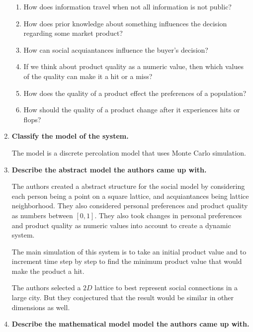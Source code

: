 \documentclass[article, 11pt, a4paper]{memoir}
\begin{document}
\begin{enumerate}[left=0pt, itemsep=20pt, label={\(\square\)}]
        \begin{enumerate}
            \item How does information travel when not all information is not public?
            \item How does prior knowledge about something influences the decision
                regarding some market product?
            \item How can social acquiantances influence the buyer's decision?
            \item If we think about product quality as a numeric value, then which values
                of the quality can make it a hit or a miss?
            \item How does the quality of a product effect the preferences of a
                population?
            \item How should the quality of a product change after it experiences hits or
                flops?
        \end{enumerate}

    \item \textbf{Classify the model of the system. }

        The model is a discrete percolation model that uses Monte Carlo simulation.

    \item \textbf{Describe the abstract model the authors came up with. }

        The authors created a abstract structure for the social model by considering each
        person being a point on a square lattice, and acquiantances being lattice
        neighborhood. They also considered personal preferences and product quality as
        numbers between \([0, 1]\). They also took changes in personal preferences and
        product quality as numeric values into account to create a dynamic system.

        The main simulation of this system is to take an initial product value and to
        increment time step by step to find the minimum product value that would make the
        product a hit. 
        
        The authors selected a \(2D\) lattice to best represent social connections in a
        large city. But they conjectured that the result would be similar in other
        dimensions as well.

    \item \textbf{Describe the mathematical model model the authors came up with.  }


\end{enumerate}
\end{document}
